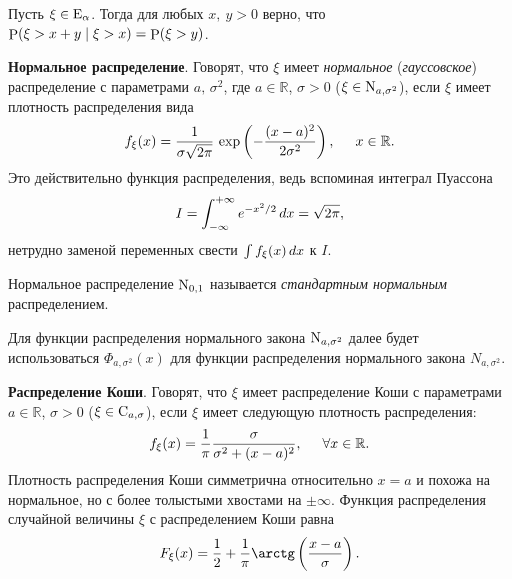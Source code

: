 \begin{to_thr}[]
    Пусть $\xi \in \textnormal{E}_\alpha$. Тогда для любых $x, \ y > 0$ верно, что
    $\P(\xi > x + y \mid \xi > x) = \P(\xi > y)$.
\end{to_thr}


\textbf{Нормальное распределение}. Говорят, что $\xi$ имеет \textit{нормальное} (\textit{гауссовское}) распределение с параметрами $a, \, \sigma^2$, где $a \in \mathbb{R}$, $\sigma > 0$ ($\xi \in \textnormal{N}_{a, \sigma^2}$), если $\xi$ имеет плотность распределения вида
\begin{equation}
    f_\xi (x) = \frac{1}{\sigma \sqrt{2 \pi}} \, \exp \left(
        - \frac{(x-a)^2}{2 \sigma^2}
    \right), 
    \hspace{5 mm}
    x \in \mathbb{R}. 
\end{equation}
Это действительно функция распределения, ведь вспоминая интеграл Пуассона
\begin{equation*}
    I = \int_{-\infty}^{+\infty} e^{-x^2/2} \d x = \sqrt{2 \pi},
\end{equation*}
нетрудно заменой переменных свести $\int f_\xi (x) \d x$ к $I$.

\begin{to_def}
    Нормальное распределение $\textnormal{N}_{0, 1}$ называется \textit{стандартным нормальным} распределением.
\end{to_def}

Для функции распределения нормального закона $\textnormal{N}_{a, \sigma^2}$ далее будет использоваться $\Phi_{a, \sigma^2} (x)$ для функции распределения нормального закона $N_{a, \sigma^2}$. 


\textbf{Распределение Коши}. Говорят, что $\xi$ имеет распределение Коши с параметрами $a \in \mathbb{R}$, $\sigma > 0$ ($\xi \in \textnormal{C}_{a, \sigma}$), если $\xi$ имеет следующую плотность распределения:
\begin{equation*}
    f_\xi (x) = \frac{1}{\pi} \frac{\sigma}{\sigma^2 + (x-a)^2}, \hspace{5 mm} \forall x \in \mathbb{R}.
\end{equation*}
Плотность распределения Коши симметрична относительно $x = a$ и похожа на нормальное, но с более толыстыми хвостами на $\pm \infty$. Функция распределения случайной величины $\xi$ с распределением Коши равна
\begin{equation*}
    F_\xi (x) = \frac{1}{2} + \frac{1}{\pi} \arctg\left(
        \frac{x-a}{\sigma}
    \right).
\end{equation*}




